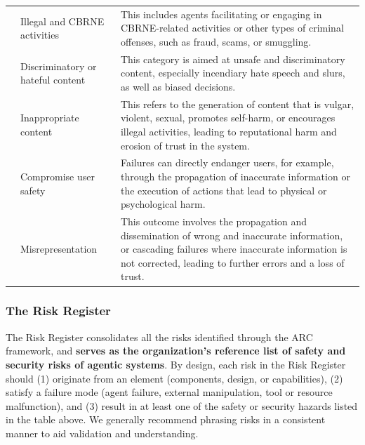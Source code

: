 \documentclass{article}
\begin{document}
\begin{table}[h]
\begin{tabularx}{\linewidth}{
  >{\centering\arraybackslash}m{2cm}   %
  >{\raggedright\arraybackslash}p{3cm} %
  >{\raggedright\arraybackslash}X        %
}
\midrule

\cellcolor{white}  & Illegal and CBRNE activities &
This includes agents facilitating or engaging in CBRNE-related activities or other types of criminal offenses, such as fraud, scams, or smuggling. \\

\cellcolor{white}  &
Discriminatory or hateful content &
This category is aimed at unsafe and discriminatory content, especially incendiary hate speech and slurs, as well as biased decisions. \\

\cellcolor{white} & Inappropriate content &
This refers to the generation of content that is vulgar, violent, sexual, promotes self-harm, or encourages illegal activities, leading to reputational harm and erosion of trust in the system. \\

\cellcolor{white}{\multirow{-5}{*}{\makecell[c]{\textbf{Safety}}}} & Compromise user safety &
Failures can directly endanger users, for example, through the propagation of inaccurate information or the execution of actions that lead to physical or psychological harm. \\

\cellcolor{white} & Misrepresentation &
This outcome involves the propagation and dissemination of wrong and inaccurate information, or cascading failures where inaccurate information is not corrected, leading to further errors and a loss of trust. \\

\bottomrule
\end{tabularx}
\end{table}

\subsubsection{The Risk Register}

The Risk Register consolidates all the risks identified through the ARC framework, and \textbf{serves as the organization's reference list of safety and security risks of agentic systems}. By design, each risk in the Risk Register should (1) originate from an element (components, design, or capabilities), (2) satisfy a failure mode (agent failure, external manipulation, tool or resource malfunction), and (3) result in at least one of the safety or security hazards listed in the table above. We generally recommend phrasing risks in a consistent manner to aid validation and understanding.
\end{document}
